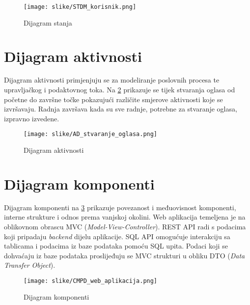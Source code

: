 				\begin{figure}[H]
					\texttt{[image: slike/STDM\_korisnik.png]}
					\centering
					\caption{Dijagram stanja}
					\label{fig:dig_stanja}
				\end{figure}
			
			
			\eject 
		
		\section{Dijagram aktivnosti}
			
%			

			Dijagram aktivnosti primjenjuju se za modeliranje poslovnih procesa te upravljačkog i podaktovnog toka. Na \ref{fig:dig_aktivnosti} prikazuje se tijek stvaranja oglasa od početne do završne točke pokazujući različite smjerove aktivnosti koje se izvršavaju. Radnja završava kada su sve radnje, potrebne za stvaranje oglasa, izpravno izvedene.

				\begin{figure}[H]
					\texttt{[image: slike/AD\_stvaranje\_oglasa.png]}
					\centering
					\caption{Dijagram aktivnosti}
					\label{fig:dig_aktivnosti}
				\end{figure}
			
			\eject
		\section{Dijagram komponenti}
		
%		

			Dijagram komponenti na \ref{fig:dig_komponenti} prikazuje povezanost i međuovisnost komponenti, interne strukture i odnos prema vanjskoj okolini. Web aplikacija temeljena je na oblikovnom obrascu MVC (\textit{Model-View-Controller}). REST API radi s podacima koji pripadaju \textit{backend} dijelu aplikacije. SQL API omogućuje interakciju sa tablicama i podacima iz baze podataka pomoću SQL upita. Podaci koji se dohvaćaju iz baze podataka proslijeđuju se MVC strukturi u obliku DTO (\textit{Data Transfer Object}).

				\begin{figure}[H]
					\texttt{[image: slike/CMPD\_web\_aplikacija.png]}
					\centering
					\caption{Dijagram komponenti}
					\label{fig:dig_komponenti}
				\end{figure}
				
			\eject

			